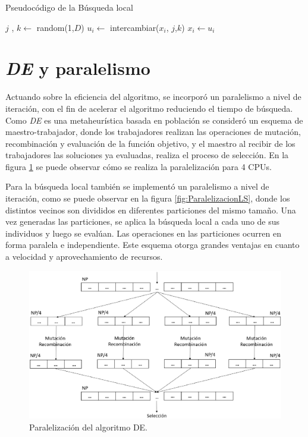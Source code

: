\begin{algorithm} [H]
    \caption{Pseudocódigo de la Búsqueda local} \label{alg:algoritmoLS} 
    \begin{algorithmic} [1]
                \State $j$ , $k \leftarrow $ random(1,$D$)
                \State $u_{i} \leftarrow $ intercambiar($x_{i}$, $j$,$k$)
                 
                    \State $x_{i} \leftarrow u_{i}$
                \EndIf
            \EndIf
        \EndFor
    \end{algorithmic}
\end{algorithm}




\section{\textit{DE} y paralelismo} \label{subsec:DEparalelo}

Actuando sobre la eficiencia del algoritmo, se incorporó un paralelismo a nivel de iteración, con el fin de acelerar el algoritmo reduciendo el tiempo de búsqueda. Como \textit{DE} es una metaheurística basada en población se consideró un esquema de maestro-trabajador, donde los trabajadores realizan las operaciones de mutación, recombinación y evaluación de la función objetivo, y el maestro al recibir de los trabajadores las soluciones ya evaluadas, realiza el proceso de selección. En la figura 
\ref{fig:ParalelizacionDE} se puede observar cómo se realiza la paralelización para 4 CPUs.


Para la búsqueda local también se implementó un paralelismo a nivel de iteración, como se puede observar en la figura \ref{fig:ParalelizacionLS}, donde los distintos vecinos son divididos en diferentes particiones del mismo tamaño. Una vez generadas las particiones, se aplica la búsqueda local a cada uno de sus individuos y luego se evalúan. Las operaciones en las particiones ocurren en forma paralela e independiente. Este esquema otorga grandes ventajas en cuanto a velocidad y aprovechamiento de recursos. 


\begin{figure}[h]
    \centering
    \includegraphics[width=\textwidth]{images/Paralelizacion-DE.eps}
    \caption{Paralelización del algoritmo DE.}
    \label{fig:ParalelizacionDE}
\end{figure}

